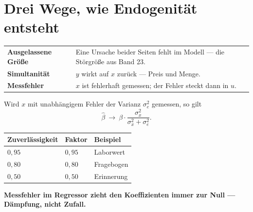 \section{Drei Wege, wie Endogenität entsteht}

\begin{merksatz}
\begin{center}
{\small
\renewcommand{\arraystretch}{1.55}
\begin{tabular}{@{}P{2.8cm}P{5.8cm}@{}}
\toprule
\textbf{Ausgelassene Größe} & Eine Ursache beider Seiten fehlt im Modell --- die Störgröße aus Band 23.\\
\textbf{Simultanität} & $y$ wirkt auf $x$ zurück --- Preis und Menge.\\
\textbf{Messfehler} & $x$ ist fehlerhaft gemessen; der Fehler steckt dann in $u$.\\
\bottomrule
\end{tabular}}
\end{center}

Wird $x$ mit unabhängigem Fehler der Varianz $\sigma_e^{2}$ gemessen, so gilt
\[ \hat\beta \ \longrightarrow\ \beta\cdot\frac{\sigma_x^{2}}{\sigma_x^{2}+\sigma_e^{2}} . \]

\begin{center}
{\small
\renewcommand{\arraystretch}{1.48}
\begin{tabular}{@{}P{2.8cm}P{2.0cm}P{2.6cm}@{}}
\toprule
\textbf{Zuverläs\-sigkeit} & \textbf{Faktor} & \textbf{Beispiel}\\
\midrule
$0{,}95$ & $0{,}95$ & Laborwert\\
$0{,}80$ & $0{,}80$ & Fragebogen\\
$0{,}50$ & $0{,}50$ & Erinnerung\\
\bottomrule
\end{tabular}}
\end{center}

\begin{center}
\begin{minipage}{0.9\textwidth}
\textbf{Messfehler im Regressor zieht den Koeffizienten immer zur Null --- Dämpfung, nicht Zufall.}
\end{minipage}
\end{center}

\begin{center}
\begin{minipage}{0.88\textwidth}
\end{minipage}
\end{center}
\end{merksatz}

